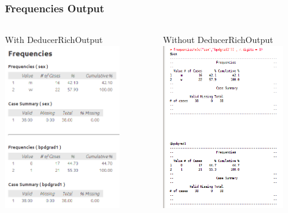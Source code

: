 \documentclass[xcolor={table},c]{beamer}
\begin{document}
\begin{frame}\frametitle{Frequencies Output}
\begin{columns}
\begin{column}{0.5\textwidth}
With DeducerRichOutput\\
\includegraphics[height=7cm]{frequ3.png} 
\end{column}
\begin{column}{0.5\textwidth}
Without DeducerRichOutput\\
\includegraphics[height=7cm]{frequ4.png}
\end{column}
\end{columns}
\end{frame}
\end{document}
